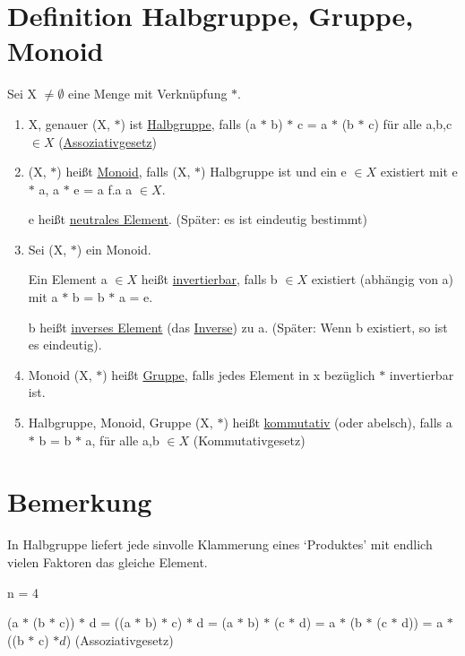 \documentclass[a4paper, openany]{book}
\begin{document}
\section{Definition Halbgruppe, Gruppe, Monoid}

Sei X $\neq \emptyset$ eine Menge mit Verknüpfung $\ast$.

\begin{enumerate}[label=(\alph*)]
  \item X, genauer (X, $\ast$) ist \underline{Halbgruppe}, falls (a $\ast$ b) $\ast$ c = a $\ast$ (b $\ast$ c) für alle a,b,c $\in X$ (\underline{Assoziativgesetz})
  
  \item (X, $\ast$) heißt \underline{Monoid}, falls (X, $\ast$) Halbgruppe ist und ein e $\in X$ existiert mit e $\ast$ a, a $\ast$ e = a f.a a $\in X$.
  
  e heißt \underline{neutrales Element}. (Später: es ist eindeutig bestimmt)
  
  \item Sei (X, $\ast$) ein Monoid.
  
  Ein Element a $\in X$ heißt \underline{invertierbar}, falls b $\in X$ existiert (abhängig von a) mit a $\ast$ b = b $\ast$ a = e.
  
  b heißt \underline{inverses Element} (das \underline{Inverse}) zu a. (Später: Wenn b existiert, so ist es eindeutig).
  
  \item Monoid (X, $\ast$) heißt \underline{Gruppe}, falls jedes Element in x bezüglich $\ast$ invertierbar ist.
  
  \item Halbgruppe, Monoid, Gruppe (X, $\ast$) heißt \underline{kommutativ} (oder abelsch), falls a $\ast$ b = b $\ast$ a, für alle a,b $\in X$ (Kommutativgesetz)
\end{enumerate}

\section{Bemerkung}
In Halbgruppe liefert jede sinvolle Klammerung eines `Produktes' mit endlich vielen Faktoren das gleiche Element.

\par \medskip
n = 4 

(a $\ast$ (b $\ast$ c)) $\ast$ d = ((a $\ast$ b) $\ast$ c) $\ast$ d = (a $\ast$ b) $\ast$ (c $\ast$ d) = a $\ast$ (b $\ast$ (c $\ast$ d)) = a $\ast$ ((b $\ast$ c) $\ast d$) (Assoziativgesetz)
\end{document}
